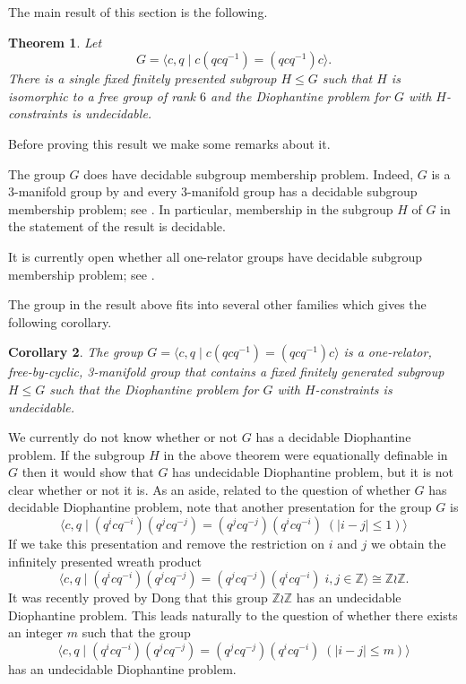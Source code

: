 \documentclass[11pt]{amsart}
\newtheorem{theorem}{Theorem}[section]
\newtheorem{cor}[theorem]{Corollary}
\theoremstyle{definition}
\numberwithin{theorem}{section}
\newcommand{\Z}{\mathbb{Z}}
\begin{document}
The main result of this section is the following. 

\begin{theorem}\label{thm:singleSubgroupConstraintsOneRelatorGroup} Let
\[
	G = \langle c, q \mid c(qcq^{-1}) = (qcq^{-1})c \rangle.
\] 
There is a single fixed finitely presented subgroup $H \leq G$ such that 
$H$ is isomorphic to a free group of rank $6$
and the Diophantine problem for $G$ with $H$-constraints is undecidable.    
  \end{theorem}
Before proving this result we make some remarks about it. 

The group $G$ does have decidable subgroup membership problem. Indeed, $G$ is a 3-manifold group by \cite{Burns1987} and every 3-manifold group has a decidable subgroup membership problem; see \cite{FriedlWilton}. In particular, membership in the subgroup $H$ of $G$ in the statement of the result is decidable.        

It is currently open whether all one-relator groups have decidable subgroup membership problem; see \cite[Problem 1.8.8]{CFMarcoOneRelatorSurvey}. 

The group in the result above fits into several other families which gives the following corollary. 

\begin{cor}\label{cor:OtherClasses} The group $ G = \langle c, q \mid c(qcq^{-1}) = (qcq^{-1})c \rangle $ 
is a one-relator, free-by-cyclic, 3-manifold group that contains a fixed finitely generated subgroup $H \leq G$ such that the Diophantine problem for $G$ with $H$-constraints is undecidable. \end{cor}

We currently do not know whether or not $G$ has a decidable Diophantine problem. If the subgroup $H$ in the above theorem were equationally definable in $G$ then it would show that $G$ has undecidable Diophantine problem, but it is not clear whether or not it is. As an aside, related to the question of whether $G$ has decidable Diophantine problem, note that another presentation for the group $G$ is    
\[
  \langle c, q \mid (q^icq^{-i})(q^jcq^{-j}) = (q^jcq^{-j}) (q^icq^{-i}) \; (|i-j| \leq 1) \rangle
\]
If we take this presentation and remove the restriction on $i$ and $j$ we obtain the infinitely presented wreath product     
\[
  \langle c, q \mid (q^icq^{-i})(q^jcq^{-j}) = (q^jcq^{-j}) (q^icq^{-i}) \; i,j \in \Z \rangle \cong \Z \wr \Z.
\]
It was recently proved by Dong \cite{Dong25} that this group $\Z \wr \Z$ has an undecidable Diophantine problem. This leads naturally to the question 
of whether there exists an integer $m$ such that the group      
\[
  \langle c, q \mid (q^icq^{-i})(q^jcq^{-j}) = (q^jcq^{-j}) (q^icq^{-i}) \; (|i-j| \leq m) \rangle
\]
has an undecidable Diophantine problem. 
\end{document}
